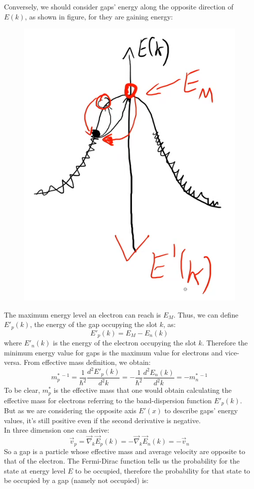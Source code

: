 \documentclass{book}
\begin{document}
                        \newpage
                        Conversely, we should consider gaps' energy along the opposite direction of $E(k)$, as shown in figure, for they are gaining energy:
                        \begin{figure}[h!]
                            \centering
                            \includegraphics[width=0.5\linewidth]{img/radio2.png}
                        \end{figure}
                        The maximum energy level an electron can reach is $E_{M}$. Thus, we can define $E'_{p}(k)$, the energy of the gap occupying the slot $k$, as:
                        $$E'_{p}(k) = E_{M} - E_{n}(k)$$
                        where $E'_{n}(k)$ is the energy of the electron occupying the slot $k$.
                        Therefore the minimum energy value for gaps is the maximum value for electrons and vice-versa.
                        From effective mass definition, we obtain:
                        $$m_{p} ^{* \ -1} = \frac{1}{\hbar ^{2}} \frac{d^{2}E'_{p}(k)}{d ^{2}k} = - \frac{1}{\hbar ^{2}} \frac{d^{2}E_{n}(k)}{d ^{2}k} = -m_{n} ^{* \ -1}$$
                        To be clear, $m^{*} _{p}$ is the effective mass that one would obtain calculating the effective mass for electrons referring to the band-dispersion function $E'_{p}(k)$. But as we are considering the opposite axis $E'(x)$  to describe gaps' energy values, it's still positive even if the second derivative is negative.\\
                        In three dimension one can derive:
                        $$\vec{v}_{p} = \vec{\nabla}_{k} \vec{E}_{p}(k) = - \vec{\nabla}_{k} \vec{E}_{n} (k) = -\vec{v}_{n}$$
                        So a gap is a particle whose effective mass and average velocity are opposite to that of the electron. The Fermi-Dirac function tells us the probability for the state at energy level $E$ to be occupied, therefore the probability for that state to be occupied by a gap (namely not occupied) is:
\end{document}
